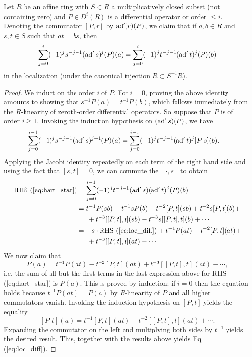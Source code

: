 \begin{lemma}
    Let $R$ be an affine ring with $S\subset R$ a multiplicatively closed subset
    (not containing zero) and $P\in D^i(R)$ is a differential operator or order $\leqslant i$.
    Denoting the commutator $[P,r]$ by $\operatorname{ad}'(r)(P)$, we claim that if $a,b\in R$
    and $s,t\in S$ such that $at=bs$, then 
    \begin{equation}
        \sum_{j=0}^i(-1)^js^{-j-1}(\operatorname{ad}'s)^j(P)(a) = \sum_{j=0}^i (-1)^jt^{-j-1}(\operatorname{ad}'t)^j(P)(b)
        \label{eq:loc_diff}
    \end{equation}
    in the localization (under the canonical injection $R\subset S^{-1}R$).
    \label{hart:lemma2}
\end{lemma}
\begin{proof}
    We induct on the order $i$ of $P$. For $i=0$, proving the above identity amounts to
    showing that $s^{-1}P(a)=t^{-1}P(b)$, which follows immediately from the $R$-linearity
    of zeroth-order differential operators. So suppose that $P$ is of order $i\geqslant 1$.
    Invoking the induction hypothesis on $(\operatorname{ad}'s)(P)$, we have
    \begin{align}
        \sum_{j=0}^{i-1} (-1)^js^{-j-1}(\operatorname{ad}'s)^{j+1}(P)(a) &= \sum_{j=0}^{i-1} (-1)^jt^{-j-1}(\operatorname{ad}'t)^j[P,s](b).
        \label{eq:hart_star}
    \end{align}
    Applying the Jacobi identity repeatedly on each term of the right hand side and using the
    fact that $[s,t]=0$, we can commute the $[\cdot, s]$ to obtain
    \begin{align*}
        \text{RHS (\ref{eq:hart_star})} &= \sum_{j=0}^{i-1} (-1)^jt^{-j-1}(\ad's)(\ad't)^j(P)(b)\\
        &= t^{-1}P(sb)-t^{-1}sP(b)-t^{-2}[P,t](sb)+t^{-2}s[P,t](b)+\\
        &\indent+ t^{-3}[ [P,t],t](sb) - t^{-3}s[ [P,t],t](b) + \cdots\\
        &= -s\cdot \text{RHS (\ref{eq:loc_diff})}+t^{-1}P(at)-t^{-2}[P,t](at)+\\
        &\indent+t^{-3}[ [P,t],t](at)-\cdots 
    \end{align*}
    We now claim that
    \[P(a)=t^{-1}P(at)-t^{-2}[P,t](at)+t^{-3}[ [P,t],t](at)-\cdots,\]
    i.e. the sum of all but the first terms in the last expression above for RHS (\ref{eq:hart_star})
    is $P(a)$. This is proved by induction: if $i=0$ then the equation holds because $t^{-1}P(at)=P(a)$
    by $R$-linearity of $P$ and all higher commutators vanish. Invoking the induction
    hypothesis on $[P,t]$ yields the equality
    \[ [P,t](a)=t^{-1}[P,t](at)-t^{-2}[ [P,t],t](at)+\cdots.\]
    Expanding the commutator on the left and multiplying both sides by $t^{-1}$ yields
    the desired result. This, together with the results above yields Eq. (\ref{eq:loc_diff}).
\end{proof}

